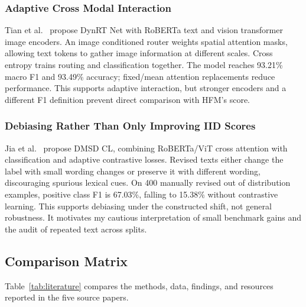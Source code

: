 \documentclass[conference]{IEEEtran}
\begin{document}
\subsubsection{Adaptive Cross Modal Interaction}
Tian et al.~\cite{tian2023} propose DynRT Net with RoBERTa text and vision transformer image encoders. An image conditioned router weights spatial attention masks, allowing text tokens to gather image information at different scales. Cross entropy trains routing and classification together. The model reaches 93.21\% macro F1 and 93.49\% accuracy; fixed/mean attention replacements reduce performance. This supports adaptive interaction, but stronger encoders and a different F1 definition prevent direct comparison with HFM's score.

\subsubsection{Debiasing Rather Than Only Improving IID Scores}
Jia et al.~\cite{jia2024} propose DMSD CL, combining RoBERTa/ViT cross attention with classification and adaptive contrastive losses. Revised texts either change the label with small wording changes or preserve it with different wording, discouraging spurious lexical cues. On 400 manually revised out of distribution examples, positive class F1 is 67.03\%, falling to 15.38\% without contrastive learning. This supports debiasing under the constructed shift, not general robustness. It motivates my cautious interpretation of small benchmark gains and the audit of repeated text across splits.

\subsection{Comparison Matrix}
Table~\ref{tab:literature} compares the methods, data, findings, and resources reported in the five source papers.
\end{document}
